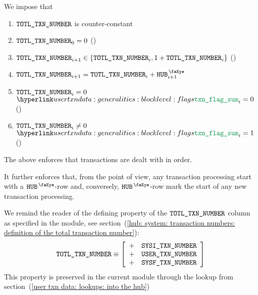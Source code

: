 We impose that
\begin{enumerate}
	\item $\texttt{TOTL}\texttt{\_}\texttt{TXN\_NUMBER}$ is counter-constant
	\item $\texttt{TOTL}\texttt{\_}\texttt{TXN\_NUMBER} _{0} = 0$ (\sanityCheck)
	\item $\texttt{TOTL}\texttt{\_}\texttt{TXN\_NUMBER} _{i + 1} \in \{ \texttt{TOTL}\texttt{\_}\texttt{TXN\_NUMBER} _{i}, 1 + \texttt{TOTL}\texttt{\_}\texttt{TXN\_NUMBER} _{i} \}$ (\sanityCheck)
	\item $\totalTransactionNumber _{i + 1} = \totalTransactionNumber _{i} + \isUserTxnHubView _{i + 1}$
	\item \If $\texttt{TOTL}\texttt{\_}\texttt{TXN\_NUMBER} _{i} =    0$ \Then $\transactionFlagSum _{i} = 0$ (\sanityCheck)
	\item \If $\texttt{TOTL}\texttt{\_}\texttt{TXN\_NUMBER} _{i} \neq 0$ \Then $\transactionFlagSum _{i} = 1$ (\sanityCheck)
\end{enumerate}
\saNote{}
The above enforces that transactions are dealt with in order.

\saNote{} \label{user txn data: generalities: total transaction number: transaction processing starts with a HUB row}
It further enforces that,
from the \txnDataMod{} point of view,
any transaction processing start with a $\isUserTxnHubView$-row
and, conversely,
$\isUserTxnHubView$-row mark the start of any new transaction processing.

\saNote{}
We remind the reader of the defining property of the $\texttt{TOTL}\texttt{\_}\texttt{TXN\_NUMBER}$ column
as specified in the \hubMod{} module,
see section~(\ref{hub: system: transaction numbers: definition of the total transaction number}):
\[
	\texttt{TOTL}\texttt{\_}\texttt{TXN\_NUMBER}
	\equiv
	\left[ \begin{array}{cl}
		+ & \texttt{SYSI}\texttt{\_}\texttt{TXN\_NUMBER} \\
		+ & \texttt{USER}\texttt{\_}\texttt{TXN\_NUMBER} \\
		+ & \texttt{SYSF}\texttt{\_}\texttt{TXN\_NUMBER} \\
	\end{array} \right]
\]
This property is preserved in the current module through the lookup
from section~(\ref{user txn data: lookups: into the hub})
